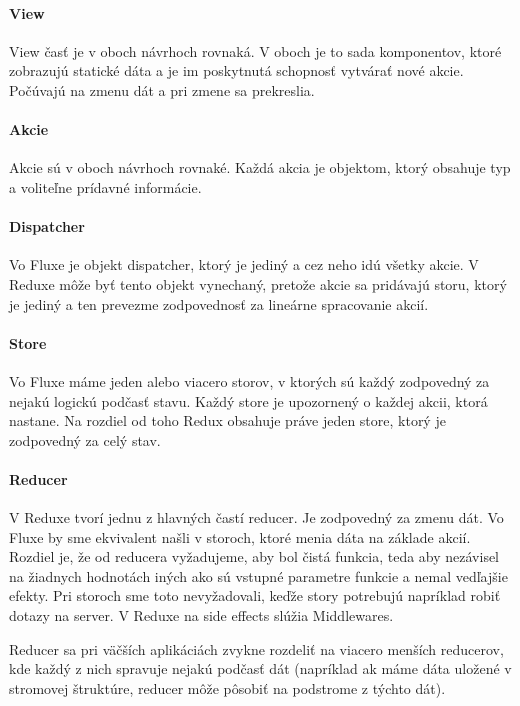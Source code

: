 \paragraph{View}%
View časť je v oboch návrhoch rovnaká. V oboch je to sada komponentov, ktoré zobrazujú statické dáta a je im poskytnutá schopnosť vytvárať nové akcie. Počúvajú na zmenu dát a pri zmene sa prekreslia.


\paragraph{Akcie}
Akcie sú v oboch návrhoch rovnaké. Každá akcia je objektom, ktorý obsahuje typ a voliteľne prídavné informácie.

\paragraph{Dispatcher}
Vo Fluxe je objekt dispatcher, ktorý je jediný a cez neho idú všetky akcie. V Reduxe môže byť tento objekt vynechaný, pretože akcie sa pridávajú storu, ktorý je jediný a ten prevezme zodpovednosť za lineárne spracovanie akcií.

\paragraph{Store}
Vo Fluxe máme jeden alebo viacero storov, v ktorých sú každý zodpovedný za nejakú logickú podčasť stavu. Každý store je upozornený o každej akcii, ktorá nastane. Na rozdiel od toho Redux obsahuje práve jeden store, ktorý je zodpovedný za celý stav.

\paragraph{Reducer}%
V Reduxe tvorí jednu z hlavných častí reducer. Je zodpovedný za zmenu dát. Vo Fluxe by sme ekvivalent našli v storoch, ktoré menia dáta na základe akcií. Rozdiel je, že od reducera vyžadujeme, aby bol čistá funkcia, teda aby nezávisel na žiadnych hodnotách iných ako sú vstupné parametre funkcie a nemal vedľajšie efekty. Pri storoch sme toto nevyžadovali, keďže story potrebujú napríklad robiť dotazy na server. V Reduxe na side effects slúžia Middlewares.

Reducer sa pri väčších aplikáciách zvykne rozdeliť na viacero menších reducerov, kde každý z nich spravuje nejakú podčasť dát (napríklad ak máme dáta uložené v stromovej štruktúre, reducer môže pôsobiť na podstrome z týchto dát).

